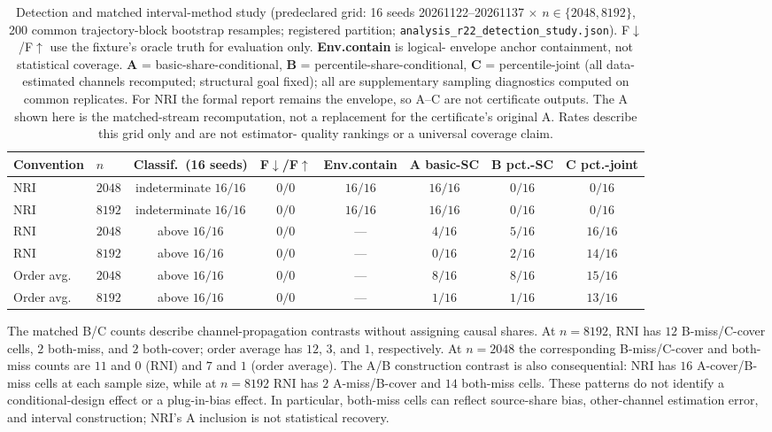 \begin{table}[htbp]
\centering\small
\setlength{\tabcolsep}{3.5pt}
\caption{Detection and matched interval-method study (predeclared grid: 16 seeds
20261122--20261137 $\times$ $n\in\{2048,8192\}$, 200 common trajectory-block
bootstrap resamples; registered partition;
\texttt{analysis\_r22\_detection\_study.json}). F$\downarrow$/F$\uparrow$ use the
fixture's oracle truth for evaluation only. \textbf{Env.contain} is logical-
envelope anchor containment, not statistical coverage. \textbf{A} =
basic-share-conditional, \textbf{B} = percentile-share-conditional, \textbf{C} =
percentile-joint (all data-estimated channels recomputed; structural goal fixed);
all are supplementary sampling diagnostics computed on common replicates. For
NRI the formal report remains the envelope, so A--C are not certificate outputs.
The A shown here is the matched-stream recomputation, not a replacement for the
certificate's original A. Rates describe this grid only and are not estimator-
quality rankings or a universal coverage claim.}
\label{tab:detection}
\begin{tabular}{@{}llcccccc@{}}
\toprule
Convention & $n$ & Classif.\ (16 seeds) & F$\downarrow$/F$\uparrow$ & Env.contain
 & A basic-SC & B pct.-SC & C pct.-joint \\
\midrule
NRI & $2048$ & indeterminate $16/16$ & $0/0$ & $16/16$ & $16/16$ & $0/16$ & $0/16$ \\
NRI & $8192$ & indeterminate $16/16$ & $0/0$ & $16/16$ & $16/16$ & $0/16$ & $0/16$ \\
RNI & $2048$ & above $16/16$ & $0/0$ & --- & $4/16$ & $5/16$ & $16/16$ \\
RNI & $8192$ & above $16/16$ & $0/0$ & --- & $0/16$ & $2/16$ & $14/16$ \\
Order avg. & $2048$ & above $16/16$ & $0/0$ & --- & $8/16$ & $8/16$ & $15/16$ \\
Order avg. & $8192$ & above $16/16$ & $0/0$ & --- & $1/16$ & $1/16$ & $13/16$ \\
\bottomrule
\end{tabular}
\end{table}

The matched B/C counts describe channel-propagation contrasts without assigning
causal shares. At $n=8192$, RNI has $12$ B-miss/C-cover cells, $2$ both-miss,
and $2$ both-cover; order average has $12$, $3$, and $1$, respectively. At
$n=2048$ the corresponding B-miss/C-cover and both-miss counts are $11$ and $0$
(RNI) and $7$ and $1$ (order average). The A/B construction contrast is also
consequential: NRI has $16$ A-cover/B-miss cells at each sample size, while at
$n=8192$ RNI has $2$ A-miss/B-cover and $14$ both-miss cells. These patterns do
not identify a conditional-design effect or a plug-in-bias effect. In particular,
both-miss cells can reflect source-share bias, other-channel estimation error,
and interval construction; NRI's A inclusion is not statistical recovery.

